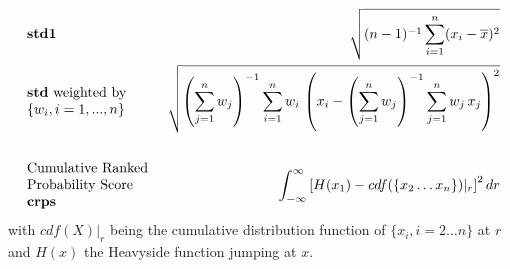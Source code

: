 {{\begin{eqnarray*}
\begin{array}{l}
\makebox[3cm][l]{\textbf{std1}} \\
\end{array}
 &  &
\sqrt{ (n-1)^{-1} \sum_{i=1}^{n} (x_i - \overline{x})^2 }
\\
\begin{array}{l}
\makebox[3cm][l]{\textbf{std} weighted by} \\
\{w_i, i=1, ..., n\}  \\
\end{array}
 & &
\sqrt{
  \left ( \sum_{j=1}^{n} w_j \right )^{-1} \sum\limits_{i=1}^{n} w_i \, 
  \left ( x_i - \left ( \sum_{j=1}^{n} w_j \right )^{-1} \sum\limits_{j=1}^{n} w_j \, x_j \right)^2 } \\
\\
\begin{array}{l}
\makebox[3cm][l]{Cumulative Ranked} \\
\makebox[3cm][l]{Probability Score} \\
\makebox[3cm][l]{\textbf{crps}} \\
\end{array}
 &  &
\int_{-\infty}^{\infty} \left[ H(x_1) - cdf(\{x_2\ldots x_n\})|_{r} \right]^2 dr \\
\end{eqnarray*}
\hspace{1cm} with \(cdf(X)|_r\) being the cumulative distribution function of \(\{x_i,i=2\ldots n\}\) at \(r\)\\

\hspace{1cm} and \(H(x)\) the Heavyside function jumping at \(x\).

}}

